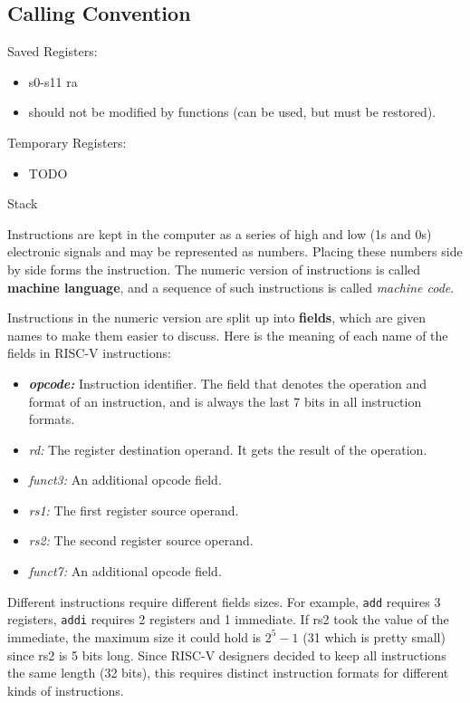 \documentclass[12pt]{article}
\begin{document}
\subsection*{Calling Convention}

Saved Registers:
\begin{itemize}
    \item s0-s11 ra
    \item should not be modified by functions (can be used, but must be restored).
\end{itemize}

Temporary Registers:
\begin{itemize}
    \item {\color{red} TODO}
\end{itemize}


Stack


Instructions are kept in the computer as a series of high and low (1s and 0s) electronic signals and may be represented as numbers. Placing these numbers side by side forms the instruction. The numeric version of instructions is called \textbf{machine language}, and a sequence of such instructions is called \emph{machine code}.

Instructions in the numeric version are split up into \textbf{fields}, which are given names to make them easier to discuss. Here is the meaning of each name of the fields in RISC-V instructions:
\begin{itemize}
    \item \emph{\textbf{opcode:}} Instruction identifier. The field that denotes the operation and format of an instruction, and is always the last 7 bits in all instruction formats.
    \item \emph{rd:} The register destination operand. It gets the result of the operation.
    \item \emph{funct3:} An additional opcode field.
    \item \emph{rs1:} The first register source operand.
    \item \emph{rs2:} The second register source operand.
    \item \emph{funct7:} An additional opcode field.
\end{itemize}

Different instructions require different fields sizes. For example, \lstinline{add} requires 3 registers, \lstinline{addi} requires 2 registers and 1 immediate. If rs2 took the value of the immediate, the maximum size it could hold is $2^5 - 1$ (31 which is pretty small) since rs2 is 5 bits long. Since RISC-V designers decided to keep all instructions the same length (32 bits), this requires distinct instruction formats for different kinds of instructions.
\end{document}
